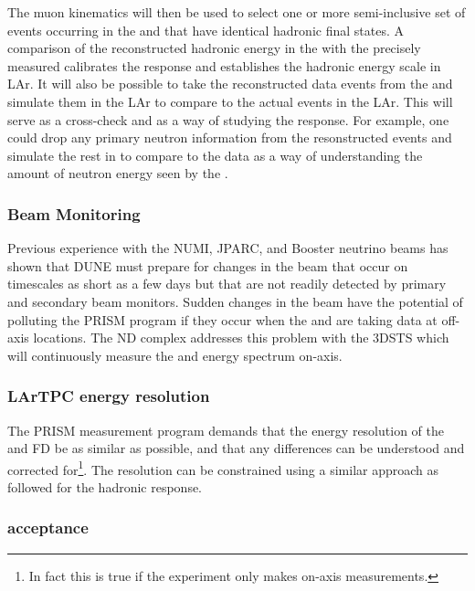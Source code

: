 The muon kinematics will then be used to select one or more semi-inclusive set of events occurring in the \larnd and  that have identical hadronic final states. A comparison of the reconstructed hadronic energy in the \larnd with the precisely measured  calibrates the response and establishes the hadronic energy scale in LAr. It will also be possible to take the reconstructed data events from the  and simulate them in the LAr to compare to the actual events in the LAr. This will serve as a cross-check and as a way of studying the response. For example, one could drop any primary neutron information from the  resonstructed events and simulate the rest in \larnd to compare to the \larnd data as a way of understanding the amount of neutron energy seen by the \larnd.

\subsubsection{Beam Monitoring}
Previous experience with the NUMI, JPARC, and Booster neutrino beams has shown that DUNE must prepare for changes in the beam that occur on timescales as short as a few days but that are not readily detected by primary and secondary beam monitors. Sudden changes in the beam have the potential of polluting the PRISM program if they occur when the \larnd and  are taking data at off-axis locations. The ND complex addresses this problem with the 3DSTS which will continuously measure the \numu and \anumu energy spectrum on-axis.


\subsubsection{LArTPC energy resolution}

The PRISM measurement program demands that the energy resolution of the \larnd and FD be as similar as possible, and that any differences can be understood and corrected for\footnote{In fact this is true if the experiment only makes on-axis measurements.}. The resolution can be constrained using a similar approach as followed for the hadronic response. 


\subsubsection{\larnd acceptance}

